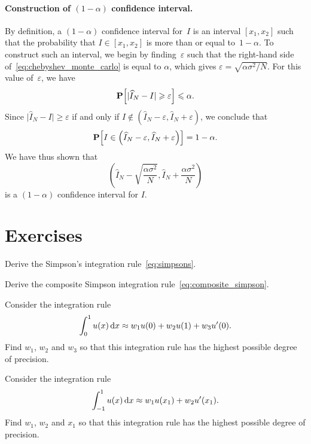 \paragraph{Construction of $(1 - \alpha)$ confidence interval.}
By definition,
a $(1 - \alpha)$ confidence interval for~$I$ is
an interval $[x_1, x_2]$ such that the probability that $I \in [x_1, x_2]$ is more than or equal to~$1 - \alpha$.
To construct such an interval,
we begin by finding~$\varepsilon$ such that the right-hand side of~\eqref{eq:chebyshev_monte_carlo} is equal to $\alpha$,
which gives $\varepsilon = \sqrt{\alpha \sigma^2 / N}$.
For this value of~$\varepsilon$, 
we have
\[
    \mathbf P\Bigl[\lvert \widehat I_N - I \rvert \geqslant \varepsilon \Bigr] \leqslant \alpha.
\]
Since $\lvert \widehat I_N - I \rvert \geq \varepsilon$ if and only if $I \notin  (\widehat I_N - \varepsilon, \widehat I_N + \varepsilon)$,
we conclude that
\[
    \mathbf P \Bigl[I \in  \left(\widehat I_N - \varepsilon, \widehat I_N + \varepsilon\right) \Bigr]   = 1 - \alpha.
\]
We have thus shown that
\[
    \left(\widehat I_N - \sqrt{\frac{\alpha \sigma^2}{N}}, \widehat I_N + \frac{\alpha \sigma^2}{N}\right)
\]
is a $(1 - \alpha)$ confidence interval for $I$.

\section{Exercises}
\begin{exercise}
    Derive the Simpson's integration rule~\eqref{eq:simpsons}.
\end{exercise}

\begin{exercise}
    \label{exercise:composite_simpson}
    Derive the composite Simpson integration rule~\eqref{eq:composite_simpson}.
\end{exercise}

\begin{exercise}
    Consider the integration rule
    \[
        \int_{0}^{1} u(x) \, \mathrm d x \approx w_1 u(0) + w_2 u(1) + w_3 u'(0).
    \]
    Find $w_1$, $w_2$ and $w_3$ so that this integration rule has the highest possible degree of precision.
\end{exercise}

\begin{exercise}
    Consider the integration rule
    \[
        \int_{-1}^{1} u(x) \, \mathrm d x \approx w_1 u(x_1) + w_2 u'(x_1).
    \]
    Find $w_1$, $w_2$ and $x_1$ so that this integration rule has the highest possible degree of precision.
\end{exercise}

